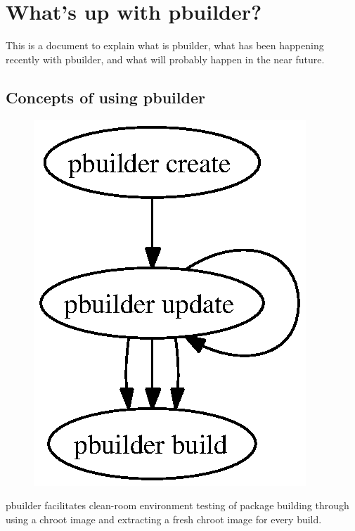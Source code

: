 \documentclass[a4paper]{article}
\begin{document}
\section{What's up with pbuilder?}

This is a document to explain what is pbuilder, what has been happening
recently with pbuilder, and what will probably happen in the near
future.

\subsection{Concepts of using pbuilder}


\begin{figure}\includegraphics[width=1\hsize]{pbuildercycle.eps}\end{figure}

pbuilder facilitates clean-room environment testing of package building
through using a chroot image and extracting a fresh chroot image for
every build.
\end{document}
